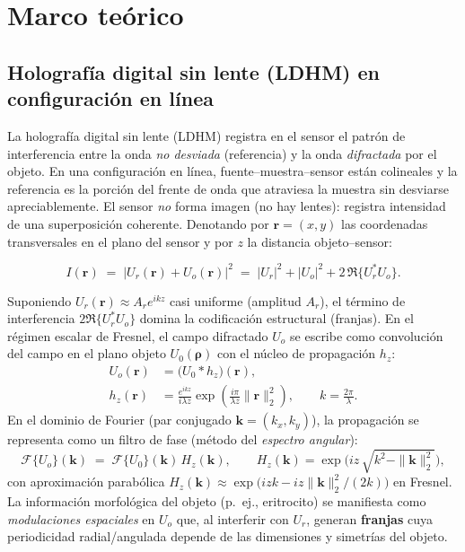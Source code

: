 \chapter{Marco teórico}
\label{chap:marco}

\section{Holografía digital sin lente (LDHM) en configuración en línea}
La holografía digital sin lente (LDHM) registra en el sensor el patrón de interferencia entre la onda \emph{no desviada} (referencia) y la onda \emph{difractada} por el objeto. En una configuración en línea, fuente–muestra–sensor están colineales y la referencia es la porción del frente de onda que atraviesa la muestra sin desviarse apreciablemente. El sensor \emph{no} forma imagen (no hay lentes): registra intensidad de una superposición coherente. Denotando por $\mathbf{r}=(x,y)$ las coordenadas transversales en el plano del sensor y por $z$ la distancia objeto–sensor:

\begin{equation}
I(\mathbf{r}) \;=\; \big|U_r(\mathbf{r}) + U_o(\mathbf{r})\big|^2 
\;=\; |U_r|^2 + |U_o|^2 + 2\,\Re\!\{U_r^\ast U_o\}.
\label{eq:holo_intensity}
\end{equation}

Suponiendo $U_r(\mathbf{r})\approx A_r e^{ikz}$ casi uniforme (amplitud $A_r$), el término de interferencia $2\Re\{U_r^\ast U_o\}$ domina la codificación estructural (franjas). En el régimen escalar de Fresnel, el campo difractado $U_o$ se escribe como convolución del campo en el plano objeto $U_0(\boldsymbol{\rho})$ con el núcleo de propagación $h_z$:
\begin{align}
U_o(\mathbf{r}) &= \big(U_0 \ast h_z\big)(\mathbf{r}),\\
h_z(\mathbf{r}) &= \frac{e^{ikz}}{i\lambda z}\exp\!\left(\frac{i\pi}{\lambda z}\|\mathbf{r}\|_2^2\right),\qquad k=\frac{2\pi}{\lambda}.
\end{align}
En el dominio de Fourier (par conjugado $\mathbf{k}=(k_x,k_y)$), la propagación se representa como un filtro de fase (método del \emph{espectro angular}):
\begin{equation}
\mathcal{F}\{U_o\}(\mathbf{k}) \;=\; \mathcal{F}\{U_0\}(\mathbf{k})\,H_z(\mathbf{k}),\qquad
H_z(\mathbf{k}) = \exp\!\big(i z\,\sqrt{k^2 - \|\mathbf{k}\|_2^2}\big),
\end{equation}
con aproximación parabólica $H_z(\mathbf{k})\approx \exp\!\big(izk - i z \|\mathbf{k}\|_2^2/(2k)\big)$ en Fresnel. La información morfológica del objeto (p.~ej., eritrocito) se manifiesta como \emph{modulaciones espaciales} en $U_o$ que, al interferir con $U_r$, generan \textbf{franjas} cuya periodicidad radial/angulada depende de las dimensiones y simetrías del objeto.

